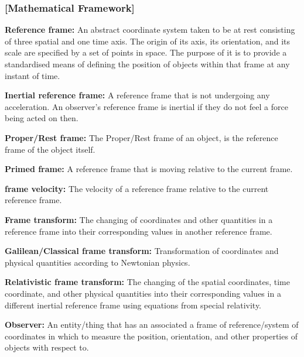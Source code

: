 
\subsubsection{[Mathematical Framework]}%

\noindent \hypertarget{def-Reference-frame}{\textbf{Reference frame:}} 
An abstract coordinate system taken to be at rest consisting of three spatial and one time axis. The origin of its axis, its orientation, and its scale are specified by a set of points in space. The purpose of it is to provide a standardised means of defining the position of objects within that frame at any instant of time.

\noindent \hypertarget{def-Inertial-reference-frame}{\textbf{Inertial reference frame:}}
A reference frame that is not undergoing any acceleration. An observer's reference frame is inertial if they do not feel a force being acted on then.

\noindent \hypertarget{def-proper-frame}{\textbf{Proper/Rest frame:}} 
The Proper/Rest frame of an object, is the reference frame of the object itself.

\noindent \hypertarget{def-Primed-Frame}{\textbf{Primed frame:}}
A reference frame that is moving relative to the current frame.

\noindent \hypertarget{def-frame-velocity}{\textbf{frame velocity:}} 
The velocity of a reference frame relative to the current reference frame.

\noindent \hypertarget{def-transform}{\textbf{Frame transform:}} 
The changing of coordinates and other quantities in a reference frame into their corresponding values in another reference frame.

\noindent \hypertarget{def-galilean-transform}{\textbf{Galilean/Classical frame transform:}}
Transformation of coordinates and physical quantities according to Newtonian physics.

\noindent \hypertarget{def-lorentz-transform}{\textbf{Relativistic frame transform:}} 
The changing of the spatial coordinates, time coordinate, and other physical quantities into their corresponding values in a different inertial reference frame using equations from special relativity.

\noindent \hypertarget{def-observer}{\textbf{Observer:}}
An entity/thing that has an associated a frame of reference/system of coordinates in which to measure the position, orientation, and other properties of objects with respect to.

